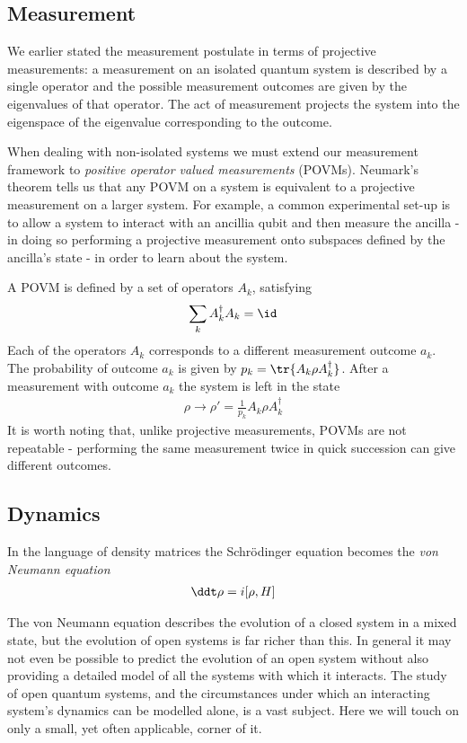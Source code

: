 \subsection{Measurement}

We earlier stated the measurement postulate in terms of projective measurements: a measurement on an isolated quantum system is described by a single operator and the possible measurement outcomes are given by the eigenvalues of that operator. The act of measurement projects the system into the eigenspace of the eigenvalue corresponding to the outcome. 

When dealing with non-isolated systems we must extend our measurement framework to \textit{positive operator valued measurements} (POVMs). Neumark's theorem \cite{peres} tells us that any POVM on a system is equivalent to a projective measurement on a larger system. For example, a common experimental set-up is to allow a system to interact with an ancillia qubit and then measure the ancilla - in doing so performing a projective measurement onto subspaces defined by the ancilla's state - in order to learn about the system.

A POVM  is defined by a set of operators $A_k$, satisfying
\begin{align}
  \label{POVM_completeness_eq}
  \sum_k A_k^\dagger A_k = \id
\end{align}
Each of the operators $A_k$ corresponds to a different measurement outcome $a_k$. The probability of outcome $a_k$ is given by $p_k = \tr\{A_k \rho A_k^\dagger\}$. After a measurement with outcome $a_k$ the system is left in the state
\begin{align}\label{POVM_normalisation_eq}
  \rho \rightarrow \rho' = \frac{1}{p_k} A_k \rho A_k^\dagger
\end{align}
It is worth noting that, unlike projective measurements, POVMs are not repeatable - performing the same measurement twice in quick succession can give different outcomes.

\subsection{Dynamics}

In the language of density matrices the Schr\"odinger equation becomes the \textit{von Neumann equation}
\begin{align}
  \ddt \rho = i [\rho, H]
\end{align}

The von Neumann equation describes the evolution of a closed system in a mixed state, but the evolution of open systems is far richer than this. In general it may not even be possible to predict the evolution of an open system without also providing a detailed model of all the systems with which it interacts. The study of open quantum systems, and the circumstances under which an interacting system's dynamics can be modelled alone, is a vast subject. Here we will touch on only a small, yet often applicable, corner of it.

